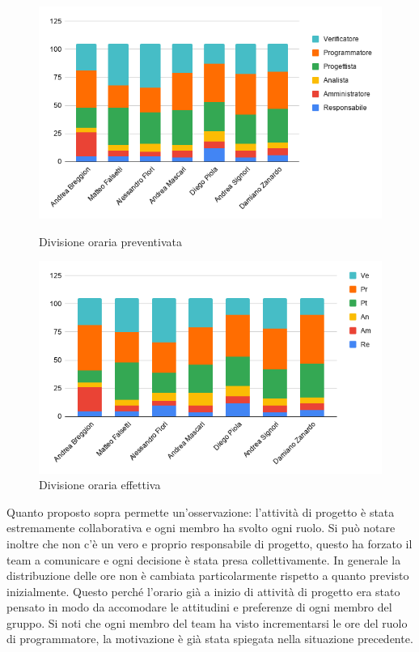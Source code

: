             \begin{figure}[H]
                \centering
                \begin{minipage}[b]{0.4\textwidth}
                  \includegraphics[width=\textwidth]{source/img/no_investimento_orari.png}
                  \caption{Divisione oraria preventivata}
                \end{minipage}
                \hfill
                \begin{minipage}[b]{0.4\textwidth}
                  \includegraphics[width=\textwidth]{source/img/no_investimento_orari_effettivo.png}
                  \caption{Divisione oraria effettiva}
                \end{minipage}
            \end{figure}

            Quanto proposto sopra permette un'osservazione: l'attività di progetto è stata estremamente collaborativa e ogni membro ha svolto ogni ruolo. Si può notare inoltre che non c'è un vero e proprio responsabile di progetto, questo ha forzato il team a comunicare e ogni decisione è stata presa collettivamente.
            In generale la distribuzione delle ore non è cambiata particolarmente rispetto a quanto previsto inizialmente. Questo perché l'orario già a inizio di attività di progetto era stato pensato in modo da accomodare le attitudini e preferenze di ogni membro del gruppo. Si noti che ogni membro del team ha visto incrementarsi le ore del ruolo di programmatore, la motivazione è già stata spiegata nella situazione precedente.

